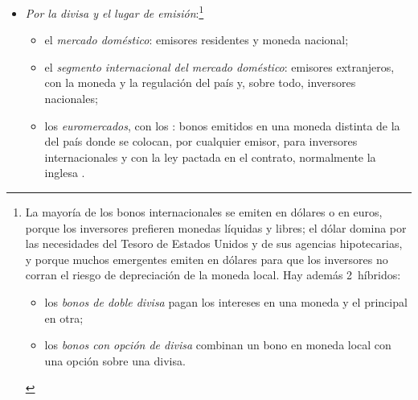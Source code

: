 \documentclass[11pt]{article}
\begin{document}
\begin{itemize}
\begin{itemize}
  \item se emite por 3~procedimientos:
    \begin{itemize}
    \item la \emph{subasta}, la habitual en la deuda pública: el Tesoro publica un calendario y los inversores presentan peticiones competitivas (importe y precio) o no competitivas (solo importe);\footnote{Las peticiones competitivas se ordenan de mayor a menor precio hasta cubrir el importe, lo que fija el precio mínimo. Las que quedan entre el precio mínimo y el precio medio ponderado pagan lo que ofrecieron, y las que lo superan y las no competitivas, el precio medio ponderado\nocite{Tesoro2026Subasta}: es la subasta «convencional corregida»  . En las letras, las ofertas se hacen en tipo de interés.}
    \item la \emph{sindicación}: un grupo de entidades coloca la emisión, asegurándola a un precio (\emph{underwriting}) o al mejor precio posible (\emph{best effort});
    \item la \emph{colocación privada}, a medida, para pocos inversores.
    \end{itemize}
  \end{itemize}
\item \emph{Por la divisa y el lugar de emisión}:\footnote{La mayoría de los bonos internacionales se emiten en dólares o en euros, porque los inversores prefieren monedas líquidas y libres; el dólar domina por las necesidades del Tesoro de Estados Unidos y de sus agencias hipotecarias, y porque muchos emergentes emiten en dólares para que los inversores no corran el riesgo de depreciación de la moneda local. Hay además 2~híbridos:
\begin{itemize}
\item los \emph{bonos de doble divisa} pagan los intereses en una moneda y el principal en otra;
\item los \emph{bonos con opción de divisa} combinan un bono en moneda local con una opción sobre una divisa.
\end{itemize}}
  \begin{itemize}
  \item el \emph{mercado doméstico}: emisores residentes y moneda nacional;
  \item el \emph{segmento internacional del mercado doméstico}: emisores extranjeros, con la moneda y la regulación del país y, sobre todo, inversores nacionales;
  \item los \emph{euromercados}, con los : bonos emitidos en una moneda distinta de la del país donde se colocan, por cualquier emisor, para inversores internacionales y con la ley pactada en el contrato, normalmente la inglesa .
  \end{itemize}
\end{itemize}
\end{document}

